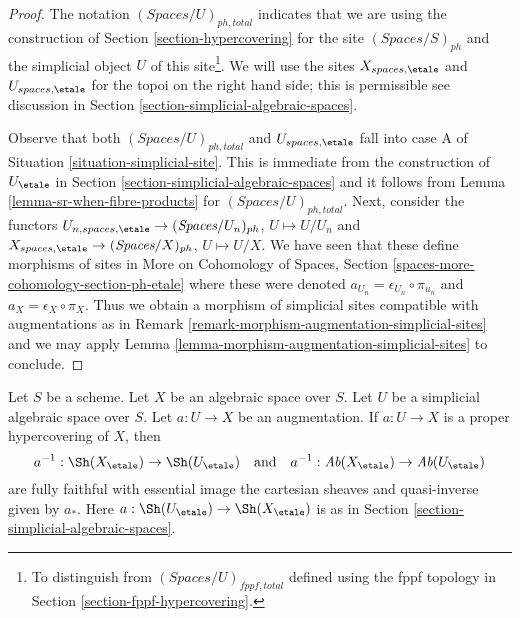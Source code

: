 \begin{proof}
The notation $(\textit{Spaces}/U)_{ph, total}$ indicates that
we are using the construction of
Section \ref{section-hypercovering}
for the site $(\textit{Spaces}/S)_{ph}$ and the
simplicial object $U$ of this site\footnote{To distinguish from
$(\textit{Spaces}/U)_{fppf, total}$ defined using the fppf
topology in Section \ref{section-fppf-hypercovering}.}.
We will use the sites $X_{spaces, \etale}$ and $U_{spaces, \etale}$
for the topoi on the right hand side; this is permissible
see discussion in Section \ref{section-simplicial-algebraic-spaces}.

\medskip\noindent
Observe that both $(\textit{Spaces}/U)_{ph, total}$ and
$U_{spaces, \etale}$
fall into case A of Situation \ref{situation-simplicial-site}.
This is immediate from the construction of
$U_\etale$ in Section \ref{section-simplicial-algebraic-spaces}
and it follows from Lemma \ref{lemma-sr-when-fibre-products}
for $(\textit{Spaces}/U)_{ph, total}$.
Next, consider the functors
$U_{n, spaces, \etale} \to (\textit{Spaces}/U_n)_{ph}$, $U \mapsto U/U_n$
and
$X_{spaces, \etale} \to (\textit{Spaces}/X)_{ph}$, $U \mapsto U/X$.
We have seen that these define morphisms of sites in
More on Cohomology of Spaces, Section
\ref{spaces-more-cohomology-section-ph-etale}
where these were denoted $a_{U_n} = \epsilon_{U_n} \circ \pi_{u_n}$
and $a_X = \epsilon_X \circ \pi_X$.
Thus we obtain a morphism of simplicial sites compatible with
augmentations as in Remark \ref{remark-morphism-augmentation-simplicial-sites}
and we may apply
Lemma \ref{lemma-morphism-augmentation-simplicial-sites} to conclude.
\end{proof}

\begin{lemma}
\label{lemma-descent-sheaves-for-ph-hypercovering}
Let $S$ be a scheme. Let $X$ be an algebraic space over $S$.
Let $U$ be a simplicial algebraic space over $S$. Let $a : U \to X$
be an augmentation. If $a : U \to X$ is a proper hypercovering of $X$,
then
$$
a^{-1} : \Sh(X_\etale) \to \Sh(U_\etale)
\quad\text{and}\quad
a^{-1} : \textit{Ab}(X_\etale) \to \textit{Ab}(U_\etale)
$$
are fully faithful with essential image the cartesian sheaves and
quasi-inverse given by $a_*$. Here $a : \Sh(U_\etale) \to \Sh(X_\etale)$
is as in Section \ref{section-simplicial-algebraic-spaces}.
\end{lemma}


